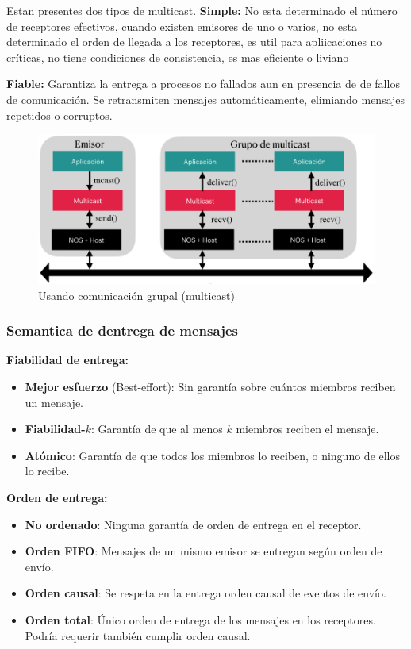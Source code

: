 Estan presentes dos tipos de multicast.
\textbf{Simple:}  No esta determinado el número de receptores efectivos, cuando existen emisores de uno o varios, no esta determinado el orden de llegada a los receptores, es util para apliicaciones no críticas, no tiene condiciones de consistencia, es mas eficiente o liviano

\textbf{Fiable:} Garantiza la entrega a procesos no fallados aun en presencia de de fallos de comunicación. Se retransmiten mensajes automáticamente, elimiando mensajes repetidos o corruptos.

\begin{figure}[H]
    \centering
    \includegraphics[width=0.4\linewidth]{img/Multicast_grupal.png}
    \caption{Usando comunicación grupal (multicast)}\label{fig:1761651184845}
\end{figure}
\subsubsection{Semantica de dentrega de mensajes}
\textbf{Fiabilidad de entrega:}
\begin{itemize}
    \item \textbf{Mejor esfuerzo} (Best-effort): Sin garantía sobre cuántos miembros reciben un mensaje.
    \item \textbf{Fiabilidad-}$k$: Garantía de que al menos $k$ miembros reciben el mensaje.
    \item \textbf{Atómico}: Garantía de que todos los miembros lo reciben, o ninguno de ellos lo recibe.
\end{itemize}
\textbf{Orden de entrega:}
\begin{itemize}
    \item \textbf{No ordenado}: Ninguna garantía de orden de entrega en el receptor.
    \item \textbf{Orden FIFO}: Mensajes de un mismo emisor se entregan según orden de envío.
    \item \textbf{Orden causal}: Se respeta en la entrega orden causal de eventos de envío.
    \item \textbf{Orden total}: Único orden de entrega de los mensajes en los receptores. Podría requerir también cumplir orden causal.
\end{itemize}

